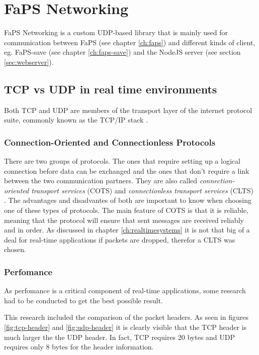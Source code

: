 \chapter{FaPS Networking}
\label{ch:faps-networking}

\author{Nico Kratky}
%
FaPS Networking is a custom UDP-based library that is mainly used for communication between FaPS (see chapter \vref{ch:faps}) and different kinds of client, eg. FaPS-save (see chapter \vref{ch:faps-save}) and the NodeJS server (see
section \vref{sec:webserver}).

\section{TCP vs UDP in real time environments}

Both TCP and UDP are members of the transport layer of the internet protocol suite, commonly known as the TCP/IP stack \autocite{rfc1122}.

\subsection{Connection-Oriented and Connectionless Protocols}

There are two groups of protocols. The ones that require setting up a logical connection before data can be exchanged and the ones that don't require a link between the two communication partners. They are also called
\textit{connection-oriented transport services} (COTS) and \textit{connectionless transport services} (CLTS) \autocite{connectionbased-vs-connectionless}. The advantages and disadvantes of both are important to know when choosing one of these types of protocols.
The main feature of COTS is that it is reliable, meaning that the protocol will ensure that sent messages are received reliably and in order. As discussed in chapter \vref{ch:realtimesystems} it is not that big of a deal for
real-time applications if packets are dropped, therefor a CLTS was chosen.

\subsection{Perfomance}

As perfomance is a critical component of real-time applications, some research had to be conducted to get the best possible result.

This research included the comparison of the packet headers. As seen in figures \vref{fig:tcp-header} and \vref{fig:udp-header} it is clearly visible that the TCP header is much larger the the UDP header. In fact, TCP requires 20 bytes and UDP requires only 8 bytes for the header information.

